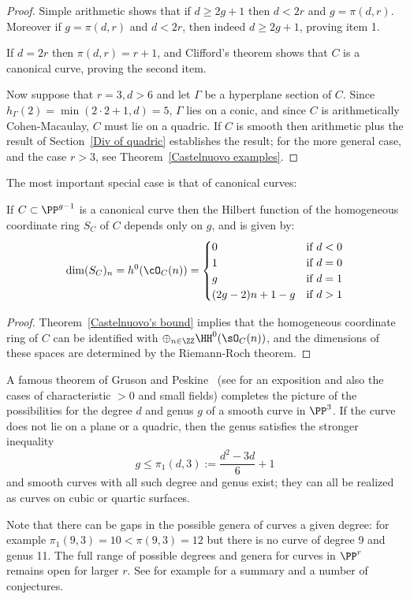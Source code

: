 \begin{proof}
Simple arithmetic shows that if $d\geq 2g+1$  then  $d<2r$ and $g= \pi(d,r)$. Moreover if $g= \pi(d,r)$ and $d<2r$,
then indeed $d\geq 2g+1$, proving item 1.

If $d= 2r$ then $\pi(d,r) = r+1$, and Clifford's theorem shows that $C$ is a canonical curve, proving the second
item.

Now suppose that $r=3, d>6$ and let $\Gamma$ be a hyperplane 
section of $C$. Since $h_{\Gamma}(2) = \min(2\cdot 2+1, d) = 5$, $\Gamma$ lies on a conic, and 
since $C$ is arithmetically Cohen-Macaulay, $C$ must lie on a quadric. 
If $C$ is smooth then arithmetic plus the result of Section~\ref{Div of quadric} establishes the result; for the more general case,
and the case $r>3$, see Theorem~\ref{Castelnuovo examples}.
\end{proof}
The most important special case is that of canonical curves:

 \begin{corollary}\label{canonical hilbert function}
If $C\subset \PP^{g-1}$ is a canonical curve then the Hilbert function of the homogeneous coordinate ring $S_{C}$ of  $C$ depends only on $g$, and is given by:
$$
\dim({S_{C}})_{n} = h^{0}(\cO_{C}(n)) = 
\begin{cases}
 0 &\mbox {if } d<0\\
 1 & \mbox {if }  d=0\\
 g & \mbox {if }  d=1\\
 (2g-2)n + 1 - g & \mbox {if }  d>1\\
\end{cases}
$$
\end{corollary}
\begin{proof}
Theorem~\ref{Castelnuovo's bound} implies that the homogeneous coordinate ring of $C$ can be identified with $\oplus_{n\in \ZZ}\HH^0(\sO_C(n))$, and the dimensions of these spaces are determined by the Riemann-Roch theorem.
\end{proof}


\begin{fact}
A famous theorem of Gruson and Peskine~\cite{MR0690647} (see \cite{MR0689536} for an exposition and also the cases of characteristic $>0$ and small fields) completes the picture of the possibilities for the degree $d$ and  genus $g$  of a smooth curve in $\PP^3$. If the curve does not lie on a plane or a quadric, then the genus satisfies the stronger inequality
$$
g\leq \pi_1(d,3) := \frac{d^2-3d}{6} +1
$$
and smooth curves with all such degree and genus exist; they can all be realized as curves
on cubic or quartic surfaces.

Note that there can be gaps in the possible genera of curves a given degree: for example  $\pi_1(9,3) = 10<\pi(9,3) =12$ but there is
no curve of degree 9 and genus 11. 
The full range of possible degrees and genera for curves in $\PP^r$ remains open for larger $r$. 
See for example \cite{MR0589222} for a summary and a number of conjectures.
\end{fact}



